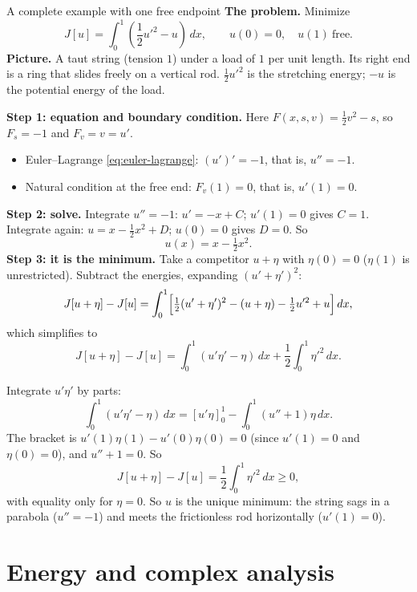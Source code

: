 \documentclass[11pt]{beamer}
\newcommand{\dd}{\,d}
\begin{document}
\begin{frame}[allowframebreaks=1.00]{A complete example with one free endpoint}
\small
\textbf{The problem.} Minimize
\[
 J[u]=\int_0^1\left(\frac12u'^2-u\right)\dd x,
 \qquad u(0)=0,\quad u(1)\ \text{free}.
\]
\textbf{Picture.} A taut string (tension \(1\)) under a load of \(1\) per unit length. Its right end is a ring
that slides freely on a vertical rod. \(\tfrac12u'^2\) is the stretching energy; \(-u\) is the potential
energy of the load.

\textbf{Step 1: equation and boundary condition.} Here \(F(x,s,v)=\tfrac12v^2-s\), so \(F_s=-1\) and \(F_v=v=u'\).
\begin{itemize}
  \item Euler--Lagrange \eqref{eq:euler-lagrange}: \((u')'=-1\), that is, \(u''=-1\).
  \item Natural condition at the free end: \(F_v(1)=0\), that is, \(u'(1)=0\).
\end{itemize}
\textbf{Step 2: solve.} Integrate \(u''=-1\): \(u'=-x+C\); \(u'(1)=0\) gives \(C=1\). Integrate again:
\(u=x-\tfrac12x^2+D\); \(u(0)=0\) gives \(D=0\). So
\[
 u(x)=x-\tfrac12x^2 .
\]
\textbf{Step 3: it is the minimum.} Take a competitor \(u+\eta\) with \(\eta(0)=0\) (\(\eta(1)\) is unrestricted).
Subtract the energies, expanding \((u'+\eta')^2\):
\[
 J[u+\eta]-J[u]=\int_0^1\Bigl[\tfrac12(u'+\eta')^2-(u+\eta)-\tfrac12u'^2+u\Bigr]\dd x ,
\]
which simplifies to
\[
 J[u+\eta]-J[u]=\int_0^1(u'\eta'-\eta)\dd x+\frac12\int_0^1\eta'^2\dd x .
\]
\par\framebreak\par
Integrate \(u'\eta'\) by parts:
\[
 \int_0^1(u'\eta'-\eta)\dd x=[u'\eta]_0^1-\int_0^1(u''+1)\eta\dd x .
\]
The bracket is \(u'(1)\eta(1)-u'(0)\eta(0)=0\) (since \(u'(1)=0\) and \(\eta(0)=0\)), and \(u''+1=0\). So
\[
 J[u+\eta]-J[u]=\frac12\int_0^1\eta'^2\dd x\ge0 ,
\]
with equality only for \(\eta=0\). So \(u\) is the unique minimum: the string sags in a parabola (\(u''=-1\))
and meets the frictionless rod horizontally (\(u'(1)=0\)).
\end{frame}

\section{Energy and complex analysis}
\end{document}

